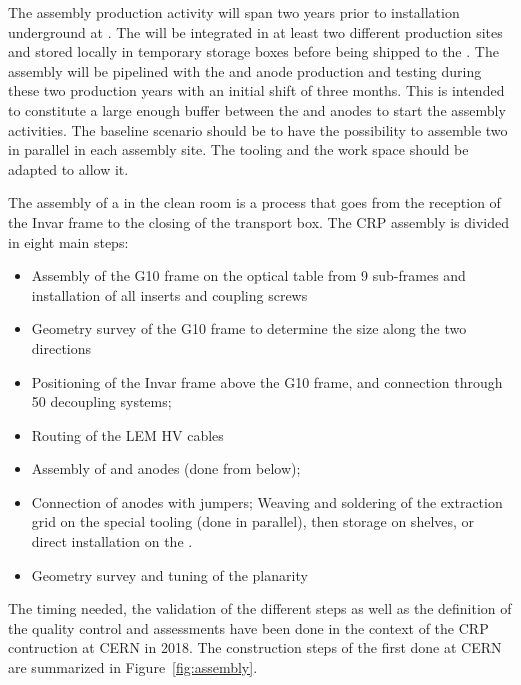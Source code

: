 The  assembly production activity will span two years 
prior to  installation underground at \surf. The  will be integrated in at least two different production sites and stored locally in temporary storage boxes before being shipped to the . %
The  assembly will be pipelined with the  and anode production and testing during these two production years with an initial  shift of three months. This is intended to constitute a large enough buffer between the  and anodes to start the  assembly activities. The baseline scenario should be to have the possibility to assemble two  in parallel in each assembly site. The tooling and the work space should be adapted to allow it.

The assembly of a  in the clean room is a process that goes from the reception of the Invar frame to the  closing of the transport box. 
The CRP assembly is divided in eight main steps:
\begin{itemize}
    \item  Assembly of the G10 frame on the optical table from \num{9} sub-frames  and installation of all inserts  and coupling screws
\item Geometry survey of the G10 frame to determine the size along the two directions
\item Positioning of the Invar frame  
above the G10 frame, and connection through \num{50} decoupling systems;
\item Routing of the LEM HV cables
\item  Assembly of  and anodes (done from below);
\item  Connection of anodes  with jumpers;
 Weaving and soldering of the extraction grid on the special tooling (done in parallel), then storage on shelves, or direct installation on the .
\item Geometry survey and tuning of the planarity
\end{itemize}

The timing needed, the validation of the different steps as well as the definition of the quality control and assessments have been done in the context of the  CRP contruction at CERN in \num{2018}. The construction  steps of the first  done at CERN are summarized in Figure~\ref{fig:assembly}.

